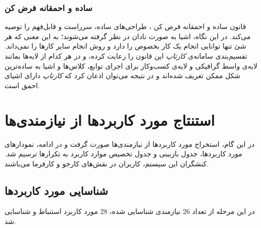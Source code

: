 \documentclass[12pt,svgnames,oneside]{book}
\begin{document}
\subsection{ساده و احمقانه فرض کن}
قانون ساده و احمقانه فرض کن
، طراحی‌های ساده، سرراست و قابل‌فهم را توصیه می‌کند. در این نگاه، اشیا به صورت نادان در نظر گرفته می‌شوند؛ به این معنی که هر شئ تنها توانایی انجام یک کار بخصوص را دارد و روش انجام سایر کار‌ها را نمی‌داند. تقسیم‌بندی سامانه‌ی \textit{کارتاپ} این قانون را رعایت کرده، و در هر کدام از لایه‌ها بمانند لایه‌ی واسط گرافیکی و لایه‌ی کسب‌وکار برای اجرای توابع، کلاس‌ها و اشیا به ساده‌ترین شکل ممکن تعریف شده‌اند و در نتیجه می‌توان اذعان کرد که \textit{کارتاپ} دارای اشیای احمق است.



\chapter{استنتاج مورد کاربرد‌ها از نیازمندی‌‌ها}		
در این گام، استخراج مورد کاربرد‌ها از نیازمندی‌ها صورت گرفت و در ادامه، نمودار‌‌های مورد کاربرد‌ها، جدول بازبینی و جدول تخصیص موارد کاربرد به تکرار‌‌ها ترسیم شد. کنشگران این سیستم، کاربران در نقش‌های کارجو و کارفرما می‌باشند.

\section{شناسایی مورد کاربرد‌ها}		
در این مرحله از تعداد 26 نیازمندی شناسایی شده، 28 مورد کاربرد استنباط و شناسایی شد.
\end{document}
